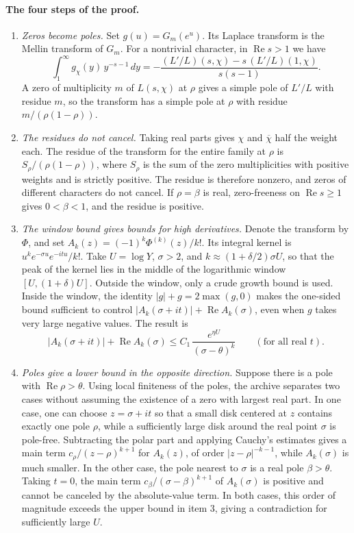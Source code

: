 \documentclass[11pt]{article}
\renewcommand{\Re}{\operatorname{Re}}
\begin{document}
\paragraph{The four steps of the proof.}
\begin{enumerate}
\item \emph{Zeros become poles.} Set $g(u)=G_m(e^u)$. Its Laplace transform is the Mellin transform of $G_m$. For a nontrivial character, in $\Re s>1$ we have
\[
\int_1^\infty g_\chi(y)\,y^{-s-1}\,dy=-\frac{(L'/L)(s,\chi)-s\,(L'/L)(1,\chi)}{s(s-1)} .
\]
A zero of multiplicity $m$ of $L(s,\chi)$ at $\rho$ gives a simple pole of $L'/L$ with residue $m$, so the transform has a simple pole at $\rho$ with residue $m/(\rho(1-\rho))$.
\item \emph{The residues do not cancel.} Taking real parts gives $\chi$ and $\overline\chi$ half the weight each. The residue of the transform for the entire family at $\rho$ is $S_\rho/(\rho(1-\rho))$, where $S_\rho$ is the sum of the zero multiplicities with positive weights and is strictly positive. The residue is therefore nonzero, and zeros of different characters do not cancel. If $\rho=\beta$ is real, zero-freeness on $\Re s\ge1$ gives $0<\beta<1$, and the residue is positive.
\item \emph{The window bound gives bounds for high derivatives.} Denote the transform by $\Phi$, and set $A_k(z)=(-1)^k\Phi^{(k)}(z)/k!$. Its integral kernel is $u^ke^{-\sigma u}e^{-itu}/k!$. Take $U=\log Y$, $\sigma>2$, and $k\approx(1+\delta/2)\sigma U$, so that the peak of the kernel lies in the middle of the logarithmic window $[U,(1+\delta)U]$. Outside the window, only a crude growth bound is used. Inside the window, the identity $|g|+g=2\max(g,0)$ makes the one-sided bound sufficient to control $|A_k(\sigma+it)|+\Re A_k(\sigma)$, even when $g$ takes very large negative values. The result is
\[
|A_k(\sigma+it)|+\Re A_k(\sigma)\le C_1\,\frac{e^{\eta U}}{(\sigma-\theta)^k}\qquad(\text{for all real } t).
\]
\item \emph{Poles give a lower bound in the opposite direction.} Suppose there is a pole with $\Re\rho>\theta$. Using local finiteness of the poles, the archive separates two cases without assuming the existence of a zero with largest real part. In one case, one can choose $z=\sigma+it$ so that a small disk centered at $z$ contains exactly one pole $\rho$, while a sufficiently large disk around the real point $\sigma$ is pole-free. Subtracting the polar part and applying Cauchy's estimates gives a main term $c_\rho/(z-\rho)^{k+1}$ for $A_k(z)$, of order $|z-\rho|^{-k-1}$, while $A_k(\sigma)$ is much smaller. In the other case, the pole nearest to $\sigma$ is a real pole $\beta>\theta$. Taking $t=0$, the main term $c_\beta/(\sigma-\beta)^{k+1}$ of $A_k(\sigma)$ is positive and cannot be canceled by the absolute-value term. In both cases, this order of magnitude exceeds the upper bound in item 3, giving a contradiction for sufficiently large $U$.
\end{enumerate}
\end{document}
